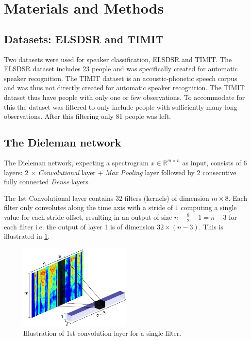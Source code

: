 \section{Materials and Methods}

\subsection{Datasets: ELSDSR and TIMIT}

Two datasets were used for speaker classification, ELSDSR and TIMIT. The ELSDSR dataset includes 23 people and was specifically created for automatic speaker recognition. The TIMIT dataset is an acoustic-phonetic speech corpus and was thus not directly created for automatic speaker recognition. The TIMIT dataset thus have people with only one or few observations. To accommodate for this the dataset was filtered to only include people with sufficiently many long observations. After this filtering only 81 people was left.

\subsection{The Dieleman network}

The Dieleman network, expecting a spectrogram $x \in \mathbb{R}^{m \times n}$ as input, consists of 6 layers: 2 $\times$ \emph{Convolutional} layer + \emph{Max Pooling} layer followed by 2 consecutive fully connected \emph{Dense} layers.


The 1st Convolutional layer contains $32$ filters (kernels) of dimension $m \times 8$. Each filter only convolutes along the time axis with a stride of $1$ computing a single value for each stride offset, resulting in an output of size $n - \frac{8}{2} + 1 = n - 3$ for each filter i.e. the output of layer 1 is of dimension $32 \times (n-3)$. This is illustrated in \cref{fig:convolution-1}.


\begin{figure}[H]
  \centering
  \includegraphics[width=0.5\textwidth]{inkscape/convolution.pdf}
  \caption{Illustration of 1st convolution layer for a single filter.}
  \label{fig:convolution-1}
\end{figure}

